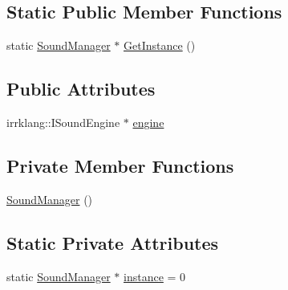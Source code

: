 \subsection*{Static Public Member Functions}
\begin{DoxyCompactItemize}
\item 
static \hyperlink{class_sound_manager}{Sound\-Manager} $\ast$ \hyperlink{class_sound_manager_a887480b38c9380c9fba23a2337df63be}{Get\-Instance} ()
\end{DoxyCompactItemize}
\subsection*{Public Attributes}
\begin{DoxyCompactItemize}
\item 
irrklang\-::\-I\-Sound\-Engine $\ast$ \hyperlink{class_sound_manager_ad4ffe937e2b5ed08e75156cfd847580f}{engine}
\end{DoxyCompactItemize}
\subsection*{Private Member Functions}
\begin{DoxyCompactItemize}
\item 
\hyperlink{class_sound_manager_abcc1fbf3488be5788a42c9a4fe56df35}{Sound\-Manager} ()
\end{DoxyCompactItemize}
\subsection*{Static Private Attributes}
\begin{DoxyCompactItemize}
\item 
static \hyperlink{class_sound_manager}{Sound\-Manager} $\ast$ \hyperlink{class_sound_manager_a14c7698bbced59a1774a3f95e0affc61}{instance} = 0
\end{DoxyCompactItemize}


